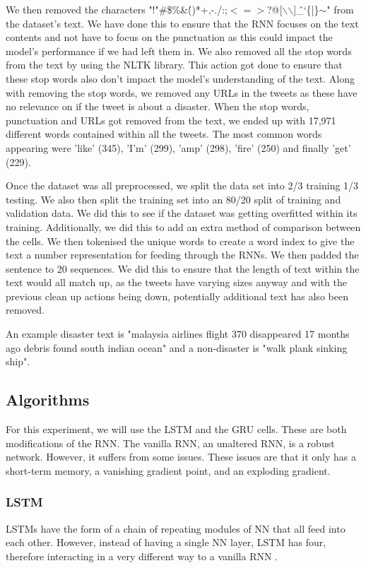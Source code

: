 \documentclass[a4paper,10pt]{article}
\begin{document}
	We then removed the characters "!"\#\$\%\&\'()*+,-./:;$<=>$?@[$\backslash$$\backslash$]\^\_`\{|\}$\sim$" from the dataset's text. We have done this to ensure that the RNN focuses on the text contents and not have to focus on the punctuation as this could impact the model's performance if we had left them in. We also removed all the stop words from the text by using the NLTK library. This action got done to ensure that these stop words also don't impact the model's understanding of the text. Along with removing the stop words, we removed any URLs in the tweets as these have no relevance on if the tweet is about a disaster. When the stop words, punctuation and URLs got removed from the text, we ended up with 17,971 different words contained within all the tweets. The most common words appearing were 'like' (345), 'I'm' (299), 'amp' (298), 'fire' (250) and finally 'get' (229).
	
	Once the dataset was all preprocessed, we split the data set into 2/3 training 1/3 testing. We also then split the training set into an 80/20 split of training and validation data. We did this to see if the dataset was getting overfitted within its training. Additionally, we did this to add an extra method of comparison between the cells. We then tokenised the unique words to create a word index to give the text a number representation for feeding through the RNNs. We then padded the sentence to 20 sequences. We did this to ensure that the length of text within the text would all match up, as the tweets have varying sizes anyway and with the previous clean up actions being down, potentially additional text has also been removed.   
	
	An example disaster text is "malaysia airlines flight 370 disappeared 17 months ago debris found south indian ocean" and a non-disaster is "walk plank sinking ship".

\subsection{Algorithms}
	For this experiment, we will use the LSTM and the GRU cells. These are both modifications of the RNN. The vanilla RNN, an unaltered RNN, is a robust network. However, it suffers from some issues. These issues are that it only has a short-term memory, a vanishing gradient point, and an exploding gradient.
	
	\subsubsection{LSTM}
	LSTMs have the form of a chain of repeating modules of NN that all feed into each other. However, instead of having a single NN layer, LSTM has four, therefore interacting in a very different way to a vanilla RNN \cite{lstm_networks}.
	
\end{document}

